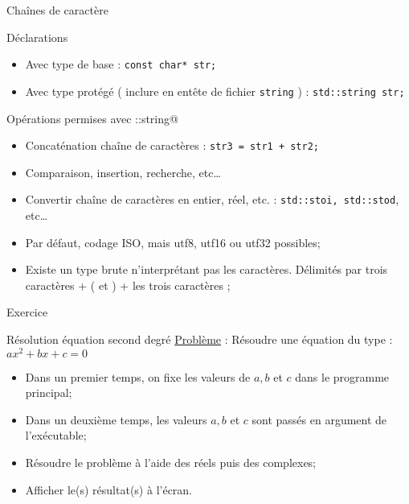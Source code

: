 \documentclass[handout,10pt]{beamer}
\newcommand{\includepartcode}[4][cpp]{

}
\begin{document}
\begin{frame}[fragile]{Chaînes de caractère}
\tiny
\begin{block}{Déclarations}
\begin{itemize}
\item Avec type de base : \lstinline$const char* str;$
\item Avec type protégé ( inclure en entête de fichier \lstinline$string$ ) :
\lstinline$std::string str;$
\end{itemize}
\end{block}
\begin{block}{Opérations permises avec \verb@std::string@}
\begin{itemize}
\item Concaténation chaîne de caractères : \lstinline$str3 = str1 + str2;$
\item Comparaison, insertion, recherche, etc\ldots
\item Convertir chaîne de caractères en entier, réel, etc. : \lstinline$std::stoi, std::stod$, etc\ldots
\item Par défaut, codage ISO, mais utf8, utf16 ou utf32 possibles;
\item Existe un type brute n'interprétant pas les caractères. Délimités par trois caractères + ( et ) + les trois caractères ;
\end{itemize}
\includepartcode{declarations.cpp}{60}{73}
\end{block}

\end{frame}

\begin{frame}[fragile]{Exercice}
\scriptsize

\begin{block}{Résolution équation second degré}
\underline{Problème} : Résoudre une équation du type : $ax^{2}+bx+c=0$
\begin{itemize}
\item Dans un premier temps, on fixe les valeurs de $a,b$ et $c$ dans le programme principal;
\item Dans un deuxième temps, les valeurs $a,b$ et $c$ sont passés en argument de l'exécutable;
\item Résoudre le problème à l'aide des réels puis des complexes;
\item Afficher le(s) résultat(s) à l'écran.
\end{itemize}
\end{block}

\end{frame}
\end{document}
